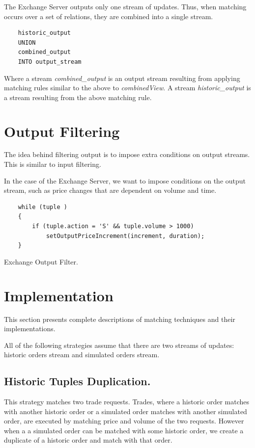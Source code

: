 \documentclass{article}
\begin{document}
The Exchange Server outputs only one stream of updates. Thus, when matching occurs over a set of relations, they are combined into a single stream.  

\begin{verbatim}
    historic_output
    UNION
    combined_output
    INTO output_stream
\end{verbatim}

Where a stream \emph{combined\_output} is an output stream resulting from applying matching rules similar to the above to \emph{combinedView}. A stream \emph{historic\_output} is a stream resulting from the above matching rule. 


\section{Output Filtering} 

The idea behind filtering output is to impose extra conditions on output streams. This is similar to input filtering. 

In the case of the Exchange Server, we want to impose conditions on the output stream, such as price changes that are dependent on volume and time. 
\begin{program}
    \begin{verbatim}  
    while (tuple )
    {
        if (tuple.action = 'S' && tuple.volume > 1000)
            setOutputPriceIncrement(increment, duration);
    }
    \end{verbatim}
\caption{Exchange Output Filter.}
\end{program}

\section{Implementation}

This section presents complete descriptions of matching techniques and their implementations. 

All of the following strategies assume that there are two streams of updates: historic orders stream and simulated orders stream.

\subsection{Historic Tuples Duplication.}

This strategy matches two trade requests. Trades, where a historic order matches with another historic order or a simulated order matches with another simulated order, are executed by matching price and volume of the two requests. However when a a simulated order can be matched with some historic order, we create a duplicate of a historic order and match with that order.
\end{document}
